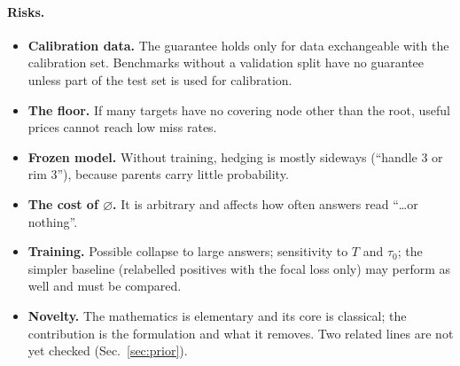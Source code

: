 \documentclass[11pt,a4paper]{article}
\theoremstyle{definition}
\theoremstyle{remark}
\newcommand{\nul}{\varnothing}
\begin{document}
\paragraph{Risks.}
\begin{itemize}
\item \textbf{Calibration data.} The guarantee holds only for data exchangeable with the calibration set. Benchmarks
without a validation split have no guarantee unless part of the test set is used for calibration.
\item \textbf{The floor.} If many targets have no covering node other than the root, useful prices cannot reach low
miss rates.
\item \textbf{Frozen model.} Without training, hedging is mostly sideways (``handle 3 or rim 3''), because parents
carry little probability.
\item \textbf{The cost of $\nul$.} It is arbitrary and affects how often answers read ``\dots or nothing''.
\item \textbf{Training.} Possible collapse to large answers; sensitivity to $T$ and $\tau_0$; the simpler baseline
(relabelled positives with the focal loss only) may perform as well and must be compared.
\item \textbf{Novelty.} The mathematics is elementary and its core is classical; the contribution is the
formulation and what it removes. Two related lines are not yet checked (Sec.~\ref{sec:prior}).
\end{itemize}
\end{document}
